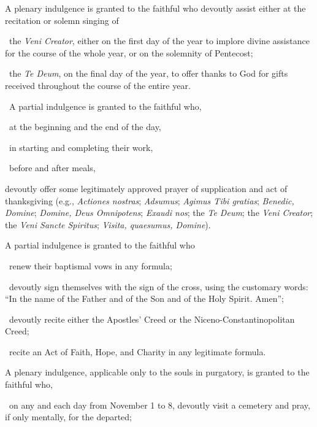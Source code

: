 \documentclass[12pt]{article}
\newcommand{\foreign}[1]{\textsl{#1}}
\begin{document}
\hypertarget{grant26}{}
 A plenary indulgence is granted to the faithful who devoutly assist either at the recitation or solemn singing of

 the \foreign{Veni Creator}, either on the first day of the year to implore divine assistance for the course of the whole year, or on the solemnity of Pentecost;

 the \foreign{Te Deum}, on the final day of the year, to offer thanks to God for gifts received throughout the course of the entire year.

 A partial indulgence is granted to the faithful who,

 at the beginning and the end of the day,

 in starting and completing their work,

 before and after meals,

devoutly offer some legitimately approved prayer of supplication and act of thanksgiving (e.g., \foreign{Actiones nostras}; \foreign{Adsumus}; \foreign{Agimus Tibi gratias}; \foreign{Benedic, Domine}; \foreign{Domine, Deus Omnipotens}; \foreign{Exaudi nos}; the \foreign{Te Deum}; the \foreign{Veni Creator}; the \foreign{Veni Sancte Spiritus}; \foreign{Visita, quaesumus, Domine}).

\hypertarget{grant28}{}
 A partial indulgence is granted to the faithful who

 renew their baptismal vows in any formula;

 devoutly sign themselves with the sign of the cross, using the customary words: ``In the name of the Father and of the Son and of the Holy Spirit. Amen'';

 devoutly recite either the Apostles' Creed or the Niceno-Constantinopolitan Creed;

 recite an Act of Faith, Hope, and Charity in any legitimate formula.

\hypertarget{grant29}{}
 A plenary indulgence, applicable only to the souls in purgatory, is granted to the faithful who,

 on any and each day from November 1 to 8, devoutly visit a cemetery and pray, if only mentally, for the departed;
\end{document}
